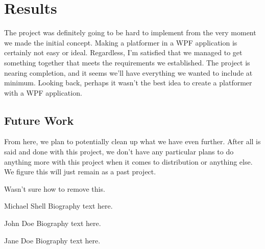 \documentclass[10pt,conference,onecolumn,compsoc]{IEEEtran}
\begin{document}
\section{Results}
The project was definitely going to be hard to implement from the very moment we made the initial concept. Making a platformer in a WPF application is certainly not easy or ideal. Regardless, I'm satisfied that we managed to get something together that meets the requirements we established. The project is nearing completion, and it seems we'll have everything we wanted to include at minimum. Looking back, perhaps it wasn't the best idea to create a platformer with a WPF application.

\subsection{Future Work}
From here, we plan to potentially clean up what we have even further. After all is said and done with this project, we don't have any particular plans to do anything more with this project when it comes to distribution or anything else. We figure this will just remain as a past project.




\begin{thebibliography}{Captain Ahab}
\item Wasn't sure how to remove this.
\end{thebibliography}


\begin{IEEEbiography}{Michael Shell}
Biography text here.
\end{IEEEbiography}

\begin{IEEEbiographynophoto}{John Doe}
Biography text here.
\end{IEEEbiographynophoto}


\begin{IEEEbiographynophoto}{Jane Doe}
Biography text here.
\end{IEEEbiographynophoto}





\end{document}
